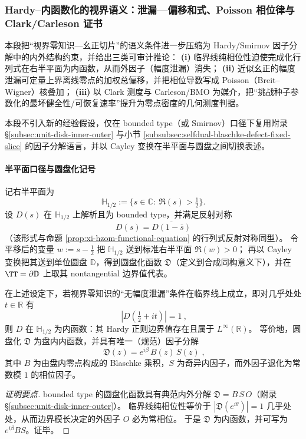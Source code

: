 \subsubsection{Hardy--内函数化的视界语义：泄漏—偏移和式、Poisson 相位律与 Clark/Carleson 证书}\label{subsubsec:xi-hardy-inner-clark-carleson}
本段把“视界零知识—幺正切片”的语义条件进一步压缩为 Hardy/Smirnov 因子分解中的内外结构约束，并给出三类可审计推论：
\textbf{(i)} 临界线纯相位性迫使完成化行列式在右半平面为内函数，从而外因子（幅度泄漏）消失；
\textbf{(ii)} 近似幺正的幅度泄漏可定量上界离线零点的加权总偏移，并把相位导数写成 Poisson（Breit--Wigner）核叠加；
\textbf{(iii)} 以 Clark 测度与 Carleson/BMO 为媒介，把“挑战种子参数化的最坏健全性/可恢复速率”提升为零点密度的几何测度判据。
\par
本段不引入新的经验假设，仅在 bounded type（或 Smirnov）口径下复用附录 \S\ref{subsec:unit-disk-inner-outer} 与小节 \ref{subsubsec:selfdual-blaschke-defect-fixed-slice} 的因子分解语言，并以 Cayley 变换在半平面与圆盘之间切换表述。

\paragraph{半平面口径与圆盘化记号}
记右半平面为
\[
\mathbb{H}_{1/2}:=\{s\in\mathbb{C}:\ \Re(s)>\tfrac12\}.
\]
设 \(D(s)\) 在 \(\mathbb{H}_{1/2}\) 上解析且为 bounded type，并满足反射对称
\begin{equation}\label{eq:xi-inner-reflection-symmetry}
\boxed{\;D(s)=\overline{D(1-\overline{s})}\;}
\end{equation}
（该形式与命题 \ref{prop:xi-hzom-functional-equation} 的行列式反射对称同型）。
令平移后的变量 \(w:=s-\tfrac12\) 把 \(\mathbb{H}_{1/2}\) 送到标准右半平面 \(\Re(w)>0\)；
再以 Cayley 变换把其送到单位圆盘 \(\mathbb{D}\)，得到圆盘化函数 \(\mathfrak{D}\)（定义到合成同构意义下），并在 \(\TT=\partial\mathbb{D}\) 上取其 nontangential 边界值代表。

\begin{theorem}\label{thm:xi-hardy-inner-characterization}
在上述设定下，若视界零知识的“无幅度泄漏”条件在临界线上成立，即对几乎处处 \(t\in\mathbb{R}\) 有
\[
\boxed{\ |D(\tfrac12+it)|=1\ },
\]
则 \(D\) 在 \(\mathbb{H}_{1/2}\) 为内函数：其 Hardy 正则边界值存在且属于 \(L^\infty(\mathbb{R})\)。
等价地，圆盘化 \(\mathfrak{D}\) 为盘内内函数，并具有唯一（规范）因子分解
\[
\boxed{\;
\mathfrak{D}(z)=e^{i\beta}\,B(z)\,S(z)\;},
\]
其中 \(B\) 为由盘内零点构成的 Blaschke 乘积，\(S\) 为奇异内因子，而外因子退化为常数模 \(1\) 的相位因子。
\end{theorem}
\begin{proof}[证明要点]
bounded type 的圆盘化函数具有典范内外分解 \(\mathfrak{D}=B\,S\,O\)（附录 \S\ref{subsec:unit-disk-inner-outer}）。
临界线纯相位性等价于 \(|\mathfrak{D}(e^{i\theta})|=1\) 几乎处处，从而边界模长决定的外因子 \(O\) 必为常相位。
于是 \(\mathfrak{D}\) 为内函数，并可写为 \(e^{i\beta}BS\)。证毕。
\end{proof}

